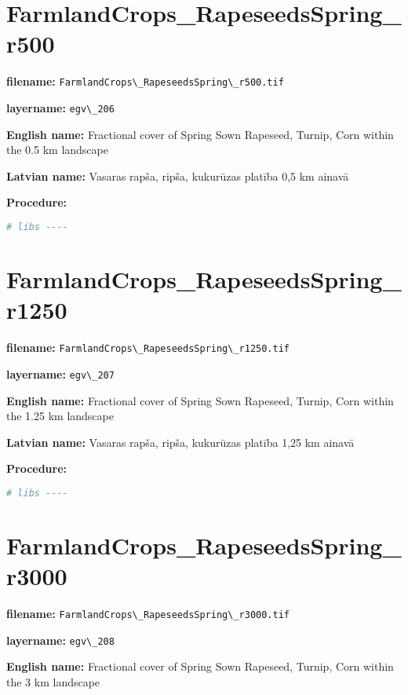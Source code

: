\documentclass[
]{book}
\newcommand{\passthrough}[1]{#1}
\begin{document}
\section{FarmlandCrops\_RapeseedsSpring\_r500}\label{ch06.206}

\textbf{filename:} \passthrough{\lstinline!FarmlandCrops\_RapeseedsSpring\_r500.tif!}

\textbf{layername:} \passthrough{\lstinline!egv\_206!}

\textbf{English name:} Fractional cover of Spring Sown Rapeseed, Turnip, Corn within the 0.5 km landscape

\textbf{Latvian name:} Vasaras rapša, ripša, kukurūzas platība 0,5 km ainavā

\textbf{Procedure:}

\begin{lstlisting}[language=R]
# libs ----
\end{lstlisting}

\section{FarmlandCrops\_RapeseedsSpring\_r1250}\label{ch06.207}

\textbf{filename:} \passthrough{\lstinline!FarmlandCrops\_RapeseedsSpring\_r1250.tif!}

\textbf{layername:} \passthrough{\lstinline!egv\_207!}

\textbf{English name:} Fractional cover of Spring Sown Rapeseed, Turnip, Corn within the 1.25 km landscape

\textbf{Latvian name:} Vasaras rapša, ripša, kukurūzas platība 1,25 km ainavā

\textbf{Procedure:}

\begin{lstlisting}[language=R]
# libs ----
\end{lstlisting}

\section{FarmlandCrops\_RapeseedsSpring\_r3000}\label{ch06.208}

\textbf{filename:} \passthrough{\lstinline!FarmlandCrops\_RapeseedsSpring\_r3000.tif!}

\textbf{layername:} \passthrough{\lstinline!egv\_208!}

\textbf{English name:} Fractional cover of Spring Sown Rapeseed, Turnip, Corn within the 3 km landscape
\end{document}
